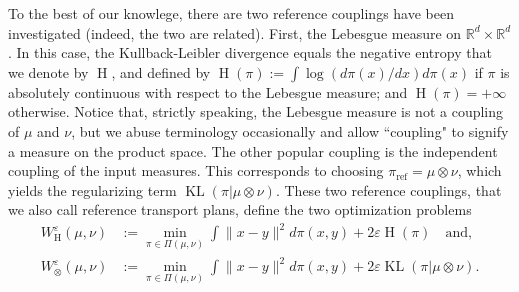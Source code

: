 \documentclass[]{article}
\DeclareMathOperator{\KL}{KL}
\DeclareMathOperator{\Hneg}{H}
\DeclareMathOperator{\refe}{ref}
\numberwithin{equation}{section}
\theoremstyle{plain}
\begin{document}
To the best of our knowlege, there are two reference couplings have been investigated (indeed, the two are related). First, the Lebesgue measure on $\mathbb{R}^d \times \mathbb{R}^d$. In this case, the Kullback-Leibler divergence equals the negative entropy that we denote by $\Hneg$, and defined by $\Hneg(\pi) := \int\log(d\pi(x)/dx) d \pi(x)$ if $\pi$ is absolutely continuous with respect to the Lebesgue measure; and $\Hneg(\pi) = +\infty$ otherwise. Notice that, strictly speaking, the Lebesgue measure is not a coupling of $\mu$ and $\nu$, but we abuse terminology occasionally and allow ``coupling" to signify a measure on the product space. The other popular coupling is the independent coupling of the input measures. This corresponds to choosing $\pi_{\refe}=\mu \otimes \nu$, which yields the regularizing term $\KL(\pi|\mu \otimes \nu)$. These two reference couplings, that we also call reference transport plans, define the two optimization problems
\begin{equation}\label{eq:classic_eot}
    \begin{split}
    W_{\Hneg}^\varepsilon(\mu, \nu) &:= \min_{\pi \in \Pi(\mu, \nu)} \int\|x-y\|^2 d\pi(x,y) + 2\varepsilon \Hneg(\pi) \quad \text{and,} \\
     W_{\otimes}^\varepsilon(\mu, \nu) & := \min_{\pi \in \Pi(\mu, \nu)} \int\|x-y\|^2 d\pi(x,y) + 2\varepsilon \KL(\pi|\mu \otimes \nu).
    \end{split}
\end{equation}
\end{document}
